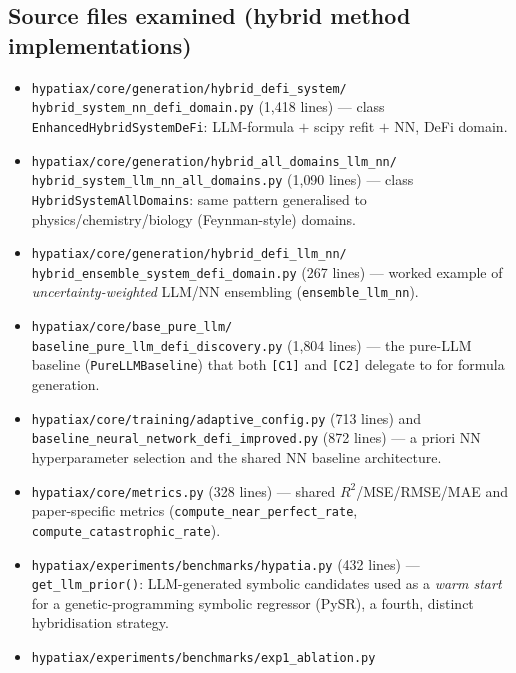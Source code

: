 \documentclass[11pt,a4paper]{article}
\newcommand{\code}[1]{\texttt{\small #1}}
\begin{document}
\subsection{Source files examined (hybrid method implementations)}
\begin{itemize}[leftmargin=1.4cm]
  \item[\code{[C1]}] \code{hypatiax/core/generation/hybrid\_defi\_system/}\\
        \code{hybrid\_system\_nn\_defi\_domain.py} (1{,}418 lines) --- class
        \code{EnhancedHybridSystemDeFi}: LLM-formula $+$ scipy refit $+$ NN,
        DeFi domain.
  \item[\code{[C2]}] \code{hypatiax/core/generation/hybrid\_all\_domains\_llm\_nn/}\\
        \code{hybrid\_system\_llm\_nn\_all\_domains.py} (1{,}090 lines) ---
        class \code{HybridSystemAllDomains}: same pattern generalised to
        physics/chemistry/biology (Feynman-style) domains.
  \item[\code{[C3]}] \code{hypatiax/core/generation/hybrid\_defi\_llm\_nn/}\\
        \code{hybrid\_ensemble\_system\_defi\_domain.py} (267 lines) ---
        worked example of \emph{uncertainty-weighted} LLM/NN ensembling
        (\code{ensemble\_llm\_nn}).
  \item[\code{[C4]}] \code{hypatiax/core/base\_pure\_llm/}\\
        \code{baseline\_pure\_llm\_defi\_discovery.py} (1{,}804 lines) --- the
        pure-LLM baseline (\code{PureLLMBaseline}) that both \code{[C1]} and
        \code{[C2]} delegate to for formula generation.
  \item[\code{[C5]}] \code{hypatiax/core/training/adaptive\_config.py}
        (713 lines) and \code{baseline\_neural\_network\_defi\_improved.py}
        (872 lines) --- a priori NN hyperparameter selection and the shared
        NN baseline architecture.
  \item[\code{[C6]}] \code{hypatiax/core/metrics.py} (328 lines) --- shared
        $R^2$/MSE/RMSE/MAE and paper-specific metrics
        (\code{compute\_near\_perfect\_rate}, \code{compute\_catastrophic\_rate}).
  \item[\code{[E1]}] \code{hypatiax/experiments/benchmarks/hypatia.py}
        (432 lines) --- \code{get\_llm\_prior()}: LLM-generated symbolic
        candidates used as a \emph{warm start} for a genetic-programming
        symbolic regressor (PySR), a fourth, distinct hybridisation
        strategy.
  \item[\code{[E2]}] \code{hypatiax/experiments/benchmarks/exp1\_ablation.py}

\end{itemize}
\end{document}
